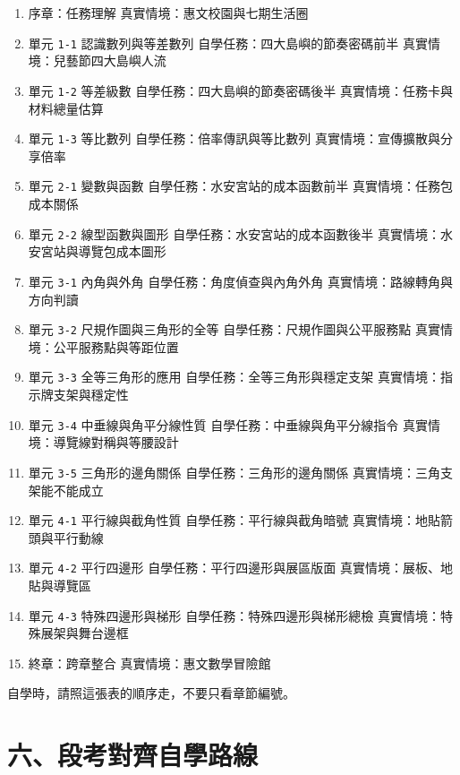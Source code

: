 \documentclass[
  chinese,
  12pt,
  a4paper,
  oneside]{article}
\providecommand{\tightlist}{%
  \setlength{\itemsep}{0pt}\setlength{\parskip}{0pt}}
\begin{document}
\begin{enumerate}
\def\labelenumi{\arabic{enumi}.}
\tightlist
\item
  序章：任務理解 真實情境：惠文校園與七期生活圈
\item
  單元 \texttt{1-1} 認識數列與等差數列 自學任務：四大島嶼的節奏密碼前半
  真實情境：兒藝節四大島嶼人流
\item
  單元 \texttt{1-2} 等差級數 自學任務：四大島嶼的節奏密碼後半
  真實情境：任務卡與材料總量估算
\item
  單元 \texttt{1-3} 等比數列 自學任務：倍率傳訊與等比數列
  真實情境：宣傳擴散與分享倍率
\item
  單元 \texttt{2-1} 變數與函數 自學任務：水安宮站的成本函數前半
  真實情境：任務包成本關係
\item
  單元 \texttt{2-2} 線型函數與圖形 自學任務：水安宮站的成本函數後半
  真實情境：水安宮站與導覽包成本圖形
\item
  單元 \texttt{3-1} 內角與外角 自學任務：角度偵查與內角外角
  真實情境：路線轉角與方向判讀
\item
  單元 \texttt{3-2} 尺規作圖與三角形的全等
  自學任務：尺規作圖與公平服務點 真實情境：公平服務點與等距位置
\item
  單元 \texttt{3-3} 全等三角形的應用 自學任務：全等三角形與穩定支架
  真實情境：指示牌支架與穩定性
\item
  單元 \texttt{3-4} 中垂線與角平分線性質 自學任務：中垂線與角平分線指令
  真實情境：導覽線對稱與等腰設計
\item
  單元 \texttt{3-5} 三角形的邊角關係 自學任務：三角形的邊角關係
  真實情境：三角支架能不能成立
\item
  單元 \texttt{4-1} 平行線與截角性質 自學任務：平行線與截角暗號
  真實情境：地貼箭頭與平行動線
\item
  單元 \texttt{4-2} 平行四邊形 自學任務：平行四邊形與展區版面
  真實情境：展板、地貼與導覽區
\item
  單元 \texttt{4-3} 特殊四邊形與梯形 自學任務：特殊四邊形與梯形總檢
  真實情境：特殊展架與舞台邊框
\item
  終章：跨章整合 真實情境：惠文數學冒險館
\end{enumerate}

自學時，請照這張表的順序走，不要只看章節編號。

\section{六、段考對齊自學路線}\label{ux516dux6bb5ux8003ux5c0dux9f4aux81eaux5b78ux8defux7dda}
\end{document}
